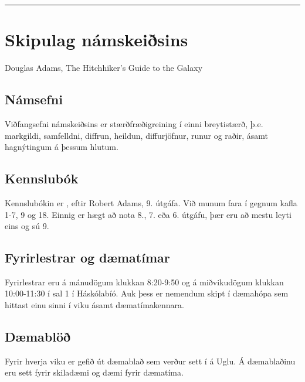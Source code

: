 \documentclass[a4paper,10pt,icelandic]{sphinxmanual}
\begin{document}
\bigskip\hrule\bigskip


\newpage


\section{Skipulag námskeiðsins}
\label{\detokenize{vidauki:skipulag-namskeisins}}



\textendash{} Douglas Adams, The Hitchhiker’s Guide to the Galaxy


\subsection{Námsefni}
\label{\detokenize{vidauki:namsefni}}
Viðfangsefni námskeiðsins er stærðfræðigreining í einni
breytistærð, þ.e. markgildi, samfelldni, diffrun, heildun, diffurjöfnur,
runur og raðir, ásamt hagnýtingum á þessum hlutum.


\subsection{Kennslubók}
\label{\detokenize{vidauki:kennslubok}}
Kennslubókin er , eftir
Robert Adams, 9. útgáfa. Við munum fara í gegnum kafla 1-7, 9 og
18. Einnig er hægt að nota 8., 7. eða 6. útgáfu, þær eru að mestu leyti eins og sú 9.


\subsection{Fyrirlestrar og dæmatímar}
\label{\detokenize{vidauki:fyrirlestrar-og-daematimar}}
Fyrirlestrar eru á mánudögum klukkan 8:20-9:50 og á miðvikudögum klukkan
10:00-11:30 í sal 1 í Háskólabíó. Auk þess er nemendum skipt
í dæmahópa sem hittast einu sinni í viku ásamt dæmatímakennara.


\subsection{Dæmablöð}
\label{\detokenize{vidauki:daemablo}}
Fyrir hverja viku er gefið út dæmablað sem
verður sett í  á Uglu. Á dæmablaðinu eru sett fyrir
skiladæmi og dæmi fyrir dæmatíma.
\end{document}
